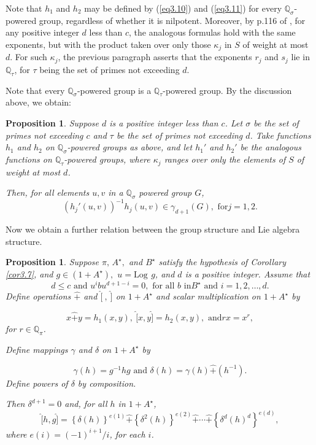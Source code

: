 \documentclass[mathscr]{amsart}
\theoremstyle{theorem}
\newtheorem{prop}[theorem]{Proposition}
\theoremstyle{definition}
\numberwithin{equation}{section}
\def \({\left(}
\def \){\right)}
\def \Log{\text{Log}\,}
\begin{document}
Note that $h_1$ and $h_2$ may be defined by (\ref{eq3.10}) and
(\ref{eq3.11}) for every $\mathbb{Q}_\sigma$-powered group,
regardless of whether it is nilpotent.  Moreover, by p.116 of
\cite{Kh}, for any positive integer $d$ less than $c$, the analogous
formulas hold with the same exponents, but with the product taken
over only those $\kappa_j$ in $S$ of weight at most $d$.  For such
$\kappa_j$, the previous paragraph asserts that the exponents $r_j$
and $s_j$ lie in $\mathbb{Q}_\tau$, for $\tau$ being the set of
primes not exceeding $d$.

Note that every $\mathbb{Q}_\sigma$-powered group is a
$\mathbb{Q}_\tau$-powered group.  By the discussion above, we
obtain:

\begin{prop}\label{prop3.8}  Suppose $d$ is a positive integer less
than $c$.  Let $\sigma$ be the set of primes not exceeding $c$ and
$\tau$ be the set of primes not exceeding $d$.  Take functions $h_1$
and $h_2$ on $\mathbb{Q}_\sigma$-powered groups as above, and let
$h_1'$ and $h_2'$ be the analogous functions on
$\mathbb{Q}_\tau$-powered groups, where $\kappa_j$  ranges over only
the elements of $S$ of weight at most $d$.

Then, for all elements $u,v$ in a $\mathbb{Q}_\sigma$ powered group
$G$,
$$\(h_j'\(u,v\)\)^{-1} h_j\(u,v\)\in\gamma_{d+1}(G),\text{ for
}j=1,2.
$$
\end{prop}

Now we obtain a further relation between the group structure and Lie
algebra structure.

\begin{prop}\label{prop3.9}
Suppose $\pi,\,A^\star,$ and $B^\star$ satisfy the hypothesis of
Corollary \ref{cor3.7}, and $g\in \(1+A^\star\),$ $u=\Log\ g$, and
$d$ is a positive integer.  Assume that
$$d\leq c\text{ and }u^ibu^{d+1-i}=0,\text{ for all }b\text{ in
}B^\star\text{ and }i=1,2,\dots,d.$$ Define operations $\hat +$ and
$\hat[\ ,\ \hat]$ on $1+A^\star$ and scalar multiplication on
$1+A^\star$ by

$$x\hat + y=h_1\(x,y\),~ \hat[x,y\hat]=h_2\(x,y\),\text{ and
}rx=x^r,$$ for $r\in \mathbb{Q}_\pi$.

Define mappings $\gamma$ and $\delta$ on $1+A^\star$ by

$$\gamma(h)=g^{-1}hg\text{ and }\delta(h) =\gamma(h)\hat
+\(h^{-1}\).$$ Define powers of $\delta$ by composition.

Then $\delta^{d+1}=0$ and, for all $h$ in $1+A^\star$,
$$
\hat[h,g\hat]=\left\{\delta(h)\right\}^{e(1)}\hat +
\left\{\delta^2(h)\right\}^{e(2)}\hat +\cdots \hat +
\left\{\delta^d(h)^d\right\}^{e(d)},
$$
 where $e(i)=(-1)^{i+1}/i$,
for each $i$.
\end{prop}
\end{document}
